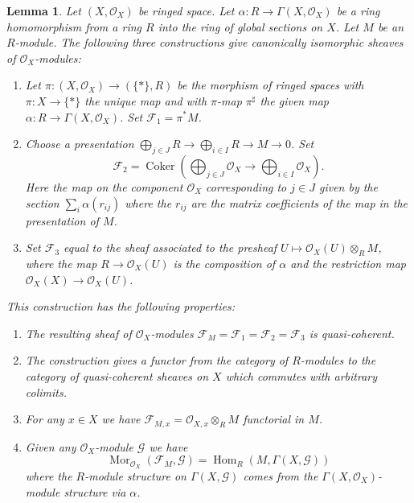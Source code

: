 \documentclass{stacks-project}
\theoremstyle{plain}
\newtheorem{lemma}[subsection]{Lemma}
\theoremstyle{definition}
\theoremstyle{remark}
\numberwithin{equation}{subsection}
\def\Hom{\mathop{\mathrm{Hom}}\nolimits}
\def\Mor{\mathop{\mathrm{Mor}}\nolimits}
\def\Coker{\mathop{\mathrm{Coker}}}
\begin{document}
\begin{lemma}
\label{lemma-construct-quasi-coherent-sheaves}
Let $(X, \mathcal{O}_X)$ be ringed space.
Let $\alpha : R \to \Gamma(X, \mathcal{O}_X)$ be a ring homomorphism from
a ring $R$ into the ring of global sections on $X$.
Let $M$ be an $R$-module.
The following three constructions give canonically isomorphic
sheaves of $\mathcal{O}_X$-modules:
\begin{enumerate}
\item Let $\pi : (X, \mathcal{O}_X) \longrightarrow (\{*\}, R)$
be the morphism of ringed spaces with $\pi : X \to \{*\}$
the unique map and with $\pi$-map $\pi^\sharp$ the given map
$\alpha : R \to \Gamma(X, \mathcal{O}_X)$. Set $\mathcal{F}_1 = \pi^*M$.
\item Choose a presentation
$\bigoplus_{j \in J} R \to \bigoplus_{i \in I} R \to M \to 0$.
Set
$$
\mathcal{F}_2 = \Coker\left(
\bigoplus\nolimits_{j \in J} \mathcal{O}_X
\to
\bigoplus\nolimits_{i \in I} \mathcal{O}_X
\right).
$$
Here the map on the component $\mathcal{O}_X$ corresponding to $j \in J$
given by the section $\sum_i \alpha(r_{ij})$ where the $r_{ij}$
are the matrix coefficients of the map in the presentation of $M$.
\item Set $\mathcal{F}_3$ equal to the sheaf associated to the presheaf
$U \mapsto \mathcal{O}_X(U) \otimes_R M$, where the map
$R \to \mathcal{O}_X(U)$ is the composition of $\alpha$ and
the restriction map $\mathcal{O}_X(X) \to \mathcal{O}_X(U)$.
\end{enumerate}
This construction has the following properties:
\begin{enumerate}
\item The resulting sheaf of $\mathcal{O}_X$-modules
$\mathcal{F}_M = \mathcal{F}_1 = \mathcal{F}_2 = \mathcal{F}_3$
is quasi-coherent.
\item The construction gives a functor from
the category of $R$-modules to the category of quasi-coherent
sheaves on $X$ which commutes with arbitrary colimits.
\item For any $x \in X$ we have
$\mathcal{F}_{M, x} = \mathcal{O}_{X, x} \otimes_R M$
functorial in $M$.
\item Given any $\mathcal{O}_X$-module
$\mathcal{G}$ we have
$$
\Mor_{\mathcal{O}_X}(\mathcal{F}_M, \mathcal{G})
=
\Hom_R(M, \Gamma(X, \mathcal{G}))
$$
where the $R$-module structure on $\Gamma(X, \mathcal{G})$
comes from the $\Gamma(X, \mathcal{O}_X)$-module structure via
$\alpha$.
\end{enumerate}
\end{lemma}
\end{document}
